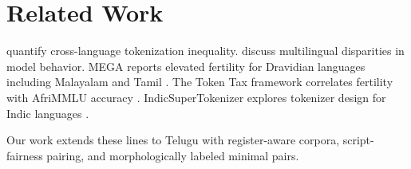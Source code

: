 \section{Related Work}

\citet{petrov2023language} quantify cross-language tokenization inequality.
\citet{ahia2023all} discuss multilingual disparities in model behavior.
MEGA reports elevated fertility for Dravidian languages including Malayalam
and Tamil \citep{mega2024}. The Token Tax framework correlates fertility
with AfriMMLU accuracy \citep{tokentax2024}. IndicSuperTokenizer explores
tokenizer design for Indic languages \citep{indicsupertokenizer2024}.

Our work extends these lines to Telugu with register-aware corpora,
script-fairness pairing, and morphologically labeled minimal pairs.
